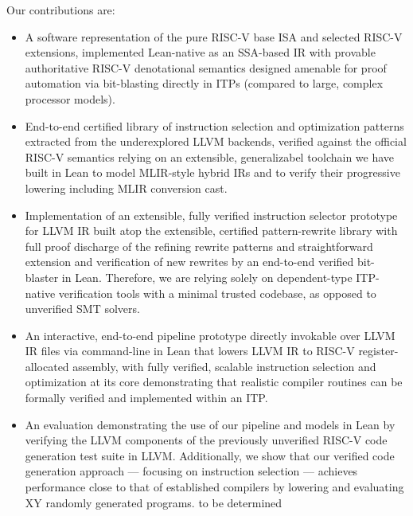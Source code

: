 \documentclass[review, anonymous, acmsmall, screen]{acmart}
\begin{document}
\vspace{.5em}
\noindent
Our contributions are:
\begin{itemize}
\item {A software representation of the pure RISC-V base ISA and selected RISC-V extensions, implemented Lean-native
 as an SSA-based IR with provable authoritative RISC-V denotational semantics designed amenable for
  proof automation via bit-blasting directly in ITPs (compared to large, complex processor models).}

\item{End-to-end certified library of instruction selection and optimization patterns extracted from
 the underexplored LLVM backends, verified against the official RISC-V semantics relying on an extensible,
  generalizabel toolchain we have built in Lean to model MLIR-style hybrid IRs and to verify their progressive
   lowering including MLIR conversion cast.}

\item {Implementation of an extensible, fully verified instruction selector prototype for LLVM IR built
 atop the extensible, certified pattern-rewrite library with full proof discharge of the refining 
 rewrite patterns and straightforward extension and verification of new rewrites by an end-to-end verified 
 bit-blaster in Lean. Therefore, we are relying solely on dependent-type ITP-native verification tools
  with a minimal trusted codebase, as opposed to unverified SMT solvers.}

\item {An interactive, end-to-end pipeline prototype directly invokable over LLVM IR files via 
command-line in Lean that lowers  LLVM IR to RISC-V register-allocated assembly, with fully verified,
 scalable instruction selection and optimization at its core  demonstrating that realistic compiler 
 routines can be formally verified and implemented within an ITP.}

\item {An evaluation demonstrating the use of our pipeline and models in Lean by verifying the LLVM 
components of the previously unverified RISC-V code generation test suite in LLVM. Additionally, we 
show that our verified code generation approach — focusing on instruction selection — achieves performance 
close to that of established compilers by lowering and evaluating XY randomly generated programs. 
to be determined }
\end{itemize}
\end{document}
